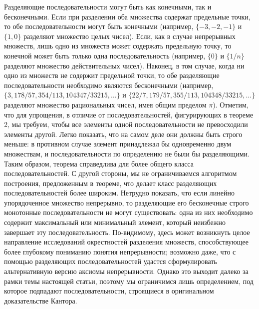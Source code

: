 \documentclass[12pt]{article}
\begin{document}
Разделяющие последовательности могут быть как конечными, так и бесконечными. Если при разделении оба множества содержат предельные точки, то обе последовательности могут быть конечными (например, $\{-3, -2, -1\}$ и $\{1, 0\}$ разделяют множество целых чисел). Если, как в случае непрерывных множеств, лишь одно из множеств может содержать предельную точку, то конечной может быть только одна последовательность (например, $\{0\}$ и $\{1/n\}$ разделяют множество действительных чисел). Наконец, в том случае, когда ни одно из множеств не содержит предельной точки, то обе разделяющие последовательности необходимо являются бесконечными (например, $\{3, 178/57, 354/113, 104347/33215, \dots\}$ и $\{22/7, 179/57, 355/113, 104348/33215, \dots\}$ разделяют множество рациональных чисел, имея общим пределом $\pi$). Отметим, что для упрощения, в отличие от последовательностей, фигурирующих в теореме 2, мы требуем, чтобы все элементы одной последовательности не превосходили элементы другой. Легко показать, что на самом деле они должны быть строго меньше: в противном случае элемент принадлежал бы одновременно двум множествам, и последовательности по определению не были бы разделяющими. Таким образом, теорема справедлива для более общего класса последовательностей. С другой стороны, мы не ограничиваемся алгоритмом построения, предложенным в теореме, что делает класс разделяющих последовательностей более широким. Нетрудно показать, что если линейно упорядоченное множество непрерывно, то разделяющие его бесконечные строго монотонные последовательности не могут существовать: одна из них необходимо содержит максимальный или минимальный элемент, который неизбежно завершает эту последовательность. По-видимому, здесь может возникнуть целое направление исследований окрестностей разделения множеств, способствующее более глубокому пониманию понятия непрерывности; возможно даже, что с помощью разделяющих последовательностей удастся сформулировать альтернативную версию аксиомы непрерывности. Однако это выходит далеко за рамки темы настоящей статьи, поэтому мы ограничимся лишь определением, под которое подпадают последовательности, строящиеся в оригинальном доказательстве Кантора. 
\end{document}
